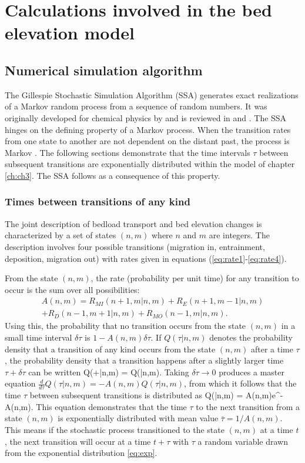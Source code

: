 

\chapter{Calculations involved in the bed elevation model}
\label{ch:gill}
\section{Numerical simulation algorithm}

The Gillespie Stochastic Simulation Algorithm (SSA) generates exact realizations of a Markov random process from a sequence of random numbers.
It was originally developed for chemical physics by \citet{Gillespie1977} and is reviewed in \citet{Gillespie1991} and \citet{Gillespie2007}.
The SSA hinges on the defining property of a Markov process. When the transition rates from one state to another are not dependent on the distant past, the process is Markov \citep[e.g.,][]{Cox1965}.
The following sections demonstrate that the time intervals $\tau$ between subsequent transitions are exponentially distributed within the model of chapter \ref{ch:ch3}. The SSA follows as a consequence of this property.

\subsection{Times between transitions of any kind}
The joint description of bedload transport and bed elevation changes is characterized by a set of states $(n,m)$ where $n$ and $m$ are integers.
The description involves four possible transitions (migration in, entrainment, deposition, migration out) with rates given in equations (\ref{eq:rate1}-\ref{eq:rate4}).

From the state $(n,m)$, the rate (probability per unit time) for any transition to occur is the sum over all possibilities:
\begin{multline} A(n,m) = R_{MI}(n+1,m|n,m) + R_E(n+1,m-1|n,m) \\+ R_D(n-1,m+1|n,m) + R_{MO}(n-1,m|n,m).\end{multline}
Using this, the probability that no transition occurs from the state $(n,m)$ in a small time interval $\delta \tau$ is $1-A(n,m)\delta \tau$. If $Q(\tau|n,m)$ denotes the probability density that a transition of any kind occurs from the state $(n,m)$ after a time $\tau$, the probability density that a transition happens after a slightly larger time $\tau + \delta \tau$ can be written
\be Q(\tau+\delta \tau|n,m) = Q(\tau|n,m).\ee
Taking $\delta\tau \rightarrow 0 $ produces a master equation $\frac{d}{d\tau}Q(\tau|n,m) = -A(n,m)Q(\tau|n,m)$, from which it follows that the time $\tau$ between subsequent transitions is distributed as 
\be Q(\tau|n,m) = A(n,m)e^{-A(n,m)\tau}. \label{eq:exp}\ee
This equation demonstrates that the time $\tau$ to the next transition from a state $(n,m)$ is exponentially distributed with mean value $\bar{\tau} = 1/A(n,m).$ This means if the stochastic process transitioned to the state $(n,m)$ at a time $t$, the next transition will occur at a time $t+\tau$ with $\tau$ a random variable drawn from the exponential distribution \ref{eq:exp}.

